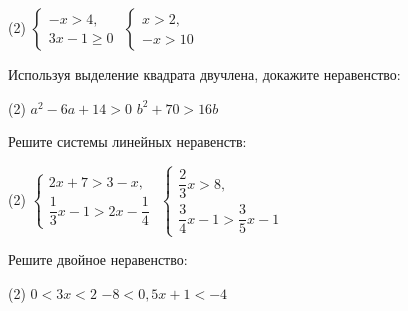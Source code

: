 \begin{class}[number=5]
\begin{listofex}[resume]
		\begin{tasks}(2)
			\task \( \left\{
			\begin{array}{l}
				-x>4,\\
				3x-1\geq0
			\end{array}
			\right. \)
		\task \( \left\{
		\begin{array}{l}
			x>2,\\
			-x>10
		\end{array}
		\right. \)
		\end{tasks}
		\item Используя выделение квадрата двучлена, докажите неравенство:
		\begin{tasks}(2)
			\task \( a^2-6a+14>0 \)
			\task \( b^2+70>16b \)
		\end{tasks}
		\item Решите системы линейных неравенств:
		\begin{tasks}(2)
			\task \( \left\{
			\begin{array}{l}
				2x+7>3-x,\\
				\dfrac{1}{3}x-1>2x-\dfrac{1}{4}
			\end{array}
			\right. \)
			\task \( \left\{
			\begin{array}{l}
				\dfrac{2}{3}x>8,\\[1em]
				\dfrac{3}{4}x-1>\dfrac{3}{5}x-1
			\end{array}
			\right. \)
		\end{tasks}
		\item Решите двойное неравенство:
		\begin{tasks}(2)
			\task \( 0<3x<2 \)
			\task \( -8<0,5x+1<-4 \)
		\end{tasks}
	\end{listofex}
\end{class}

